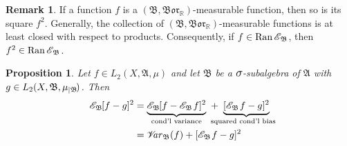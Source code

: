 \documentclass[
twoside=true,
paper=letter,
fontsize=9pt,
pagesize=auto,
leqno,
openany,
headsepline,
overfullrule,
]{scrbook}
\theoremstyle{plain}
\theoremstyle{plain}
\newtheorem{prop}[thm]{Proposition}
\theoremstyle{definition}
\newtheorem{rmk}[thm]{Remark}
\theoremstyle{bfnoteitalic}
\theoremstyle{bfnoteroman}
\newcommand{\sigalg}[1]{\mathfrak{#1}}
\newcommand{\cali}[1]{\mathscr{#1}}
\DeclareMathOperator{\range}{Ran}
\newcommand{\condexpsub}[2]
{\mathop{\cali{E}\hspace{-1.5pt}}\nolimits_{#2}\hspace{-1pt}#1}
\newcommand{\condexpop}[1]{\mathop{\cali{E}\hspace{-1pt}}\nolimits_{#1}}
\newcommand{\condvarsub}[2]
{\mathop{\cali{V}\hspace{-3pt}\mathit{ar}}\nolimits_{#2}(#1)}
\newcommand{\borel}{\mathfrak{Bor}}
\newcommand{\textsigma}{\hbox{\large{$\sigma$}}\kern-1pt}
\newcommand{\restrictedto}[1]{_{\lvert#1}\kern-1.5pt}
\newcommand{\R}{\mathbb{R}}
\newcommand{\sigmaalgebra}{\sigalg{A}}
\newcommand{\sigmaalgebraii}{\sigalg{B}}
\newcommand{\Ltwo}{L_2(\measurespace, \sigmaalgebra, \measure)}
\newcommand{\sigalgb}{\sigmaalgebraii}
\newcommand{\function}{f}
\newcommand{\functionii}{g}
\newcommand{\measurespace}{X}
\newcommand{\measure}{\mu}
\begin{document}
\begin{rmk}
If a function $\function$ is a $(\sigalgb,\borel_\R)$\hyp{}measurable function, then so is its square $\function^2$.  Generally, the collection of $(\sigalgb,\borel_\R)$\hyp{}measurable functions is at least closed with respect to products.  Consequently, if 
$\function\in\range\condexpop{\sigalgb}$, then 
$\function^2\in\range\condexpop{\sigalgb}$.
\end{rmk}




\begin{prop}\label{conditional_bias_variance}
Let $\function\in\Ltwo$ and let $\sigmaalgebraii$ be a $\textsigma$-subalgebra of $\sigmaalgebra$ with
$\functionii\in L_2(\measurespace, \sigmaalgebraii,\measure\restrictedto{\sigmaalgebraii})$. Then
\begin{align*}
\condexpsub{[\function-\functionii]^2}{\sigmaalgebraii} 
&=
\underbrace{\condexpsub{[\function-\condexpsub{\function}{\sigmaalgebraii}]^2}{\sigmaalgebraii}}_{\text{cond'l variance}} 
\ +
\ \underbrace{[\condexpsub{\function}{\sigmaalgebraii}-\functionii]^2}
_{\llap{$\scriptstyle\text{squared cond'l bias}$}}\\
&=\condvarsub{\function}{\sigmaalgebraii} + [\condexpsub{\function}{\sigmaalgebraii}-\functionii]^2
\end{align*}
\end{prop}
\end{document}
